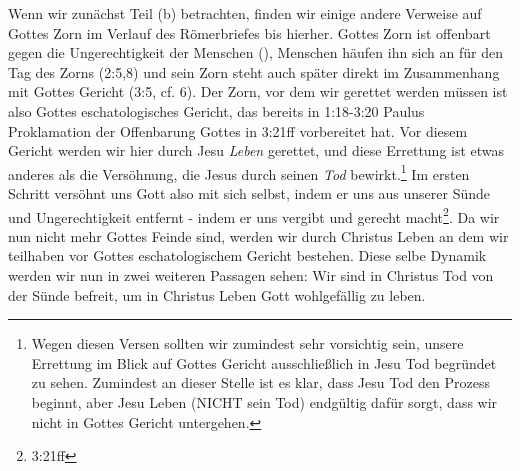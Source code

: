 Wenn wir zunächst Teil (b) betrachten, finden wir einige andere Verweise auf Gottes Zorn im Verlauf des Römerbriefes bis hierher.
Gottes Zorn ist offenbart gegen die Ungerechtigkeit der Menschen (),
Menschen häufen ihn sich an für den Tag des Zorns (2:5,8) und sein Zorn steht auch später direkt im Zusammenhang mit Gottes Gericht (3:5, cf. 6).
Der Zorn, vor dem wir gerettet werden müssen ist also Gottes eschatologisches Gericht, das bereits in 1:18-3:20 Paulus
Proklamation der Offenbarung Gottes in 3:21ff vorbereitet hat.
Vor diesem Gericht werden wir hier durch Jesu \textit{Leben} gerettet, und diese Errettung ist etwas anderes als die Versöhnung,
die Jesus durch seinen \textit{Tod} bewirkt.\footnote{
	Wegen diesen Versen sollten wir zumindest sehr vorsichtig sein, unsere Errettung im Blick auf Gottes Gericht ausschließlich
	in Jesu Tod begründet zu sehen.
	Zumindest an dieser Stelle ist es klar, dass Jesu Tod den Prozess beginnt, aber Jesu Leben (NICHT sein Tod) endgültig dafür sorgt,
	dass wir nicht in Gottes Gericht untergehen.
}
Im ersten Schritt versöhnt uns Gott also mit sich selbst, indem er uns aus unserer Sünde und Ungerechtigkeit entfernt -
indem er uns vergibt und gerecht macht\footnote{3:21ff}.
Da wir nun nicht mehr Gottes Feinde sind, werden wir durch Christus Leben an dem wir teilhaben vor Gottes eschatologischem Gericht bestehen.
Diese selbe Dynamik werden wir nun in zwei weiteren Passagen sehen:
Wir sind in Christus Tod von der Sünde befreit, um in Christus Leben Gott wohlgefällig zu leben.

